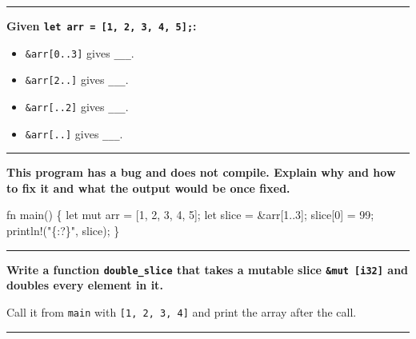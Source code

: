 \documentclass[
  11pt,
]{article}
\newenvironment{Shaded}{}{}
\newcommand{\NormalTok}[1]{#1}
\providecommand{\tightlist}{%
  \setlength{\itemsep}{0pt}\setlength{\parskip}{0pt}}
\begin{document}
\begin{center}\rule{0.5\linewidth}{0.5pt}\end{center}

\textbf{Given \texttt{let\ arr\ =\ {[}1,\ 2,\ 3,\ 4,\ 5{]};}:}

\begin{itemize}
\tightlist
\item
  \texttt{\&arr{[}0..3{]}} gives \texttt{\_\_\_}.
\item
  \texttt{\&arr{[}2..{]}} gives \texttt{\_\_\_}.
\item
  \texttt{\&arr{[}..2{]}} gives \texttt{\_\_\_}.
\item
  \texttt{\&arr{[}..{]}} gives \texttt{\_\_\_}.
\end{itemize}

\begin{center}\rule{0.5\linewidth}{0.5pt}\end{center}

\textbf{This program has a bug and does not compile. Explain why and how
to fix it and what the output would be once fixed.}

\begin{Shaded}
\begin{Highlighting}[]
\NormalTok{fn main() \{}
\NormalTok{    let mut arr = [1, 2, 3, 4, 5];}
\NormalTok{    let slice = \&arr[1..3];}
\NormalTok{    slice[0] = 99;}
\NormalTok{    println!("\{:?\}", slice);}
\NormalTok{\}}
\end{Highlighting}
\end{Shaded}

\begin{center}\rule{0.5\linewidth}{0.5pt}\end{center}

\textbf{Write a function \texttt{double\_slice} that takes a mutable
slice \texttt{\&mut\ {[}i32{]}} and doubles every element in it.}

Call it from \texttt{main} with \texttt{{[}1,\ 2,\ 3,\ 4{]}} and print
the array after the call.

\begin{Shaded}
\begin{Highlighting}[]

\end{Highlighting}
\end{Shaded}

\begin{center}\rule{0.5\linewidth}{0.5pt}\end{center}
\end{document}
